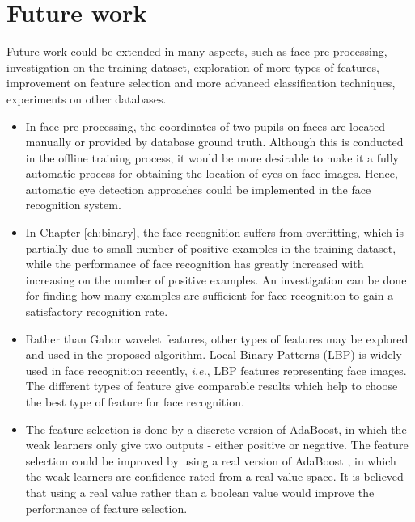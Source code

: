 
\section{Future work}
Future work could be extended in many aspects, such as face pre-processing, investigation on the training dataset, exploration of more types of features, improvement on feature selection and more advanced classification techniques, experiments on other databases.

\begin{itemize}
\item In face pre-processing, the coordinates of two pupils on faces are located manually or provided by database ground truth. Although this is conducted in the offline training process, it would be more desirable to make it a fully automatic process for obtaining the location of eyes on face images. Hence, automatic eye detection approaches could be implemented in the face recognition system.
\item In \mbox{Chapter} \ref{ch:binary}, the face recognition suffers from overfitting, which is partially due to small number of positive examples in the training dataset, while the performance of face recognition has greatly increased with increasing on the number of positive examples. An investigation can be done for finding how many examples are sufficient for face recognition to gain a satisfactory recognition rate.
\item Rather than Gabor wavelet features, other types of features may be  explored and used in the proposed algorithm. Local Binary Patterns (LBP) \cite{Ojala2002,Ahonen2004,Ahonen2006} is widely used in face recognition recently, \textit{i.e.}, LBP features representing face images. The different types of feature give comparable results which help to choose the best type of feature for face recognition.
\item The feature selection is done by a discrete version of AdaBoost, in which the weak learners only give two outputs - either positive or negative. The feature selection could be improved by using a real version of AdaBoost \cite{Schapire1999ml}, in which the weak learners are confidence-rated from a real-value space. It is believed that using a real value rather than a boolean value would improve the performance of feature selection.

\end{itemize}
